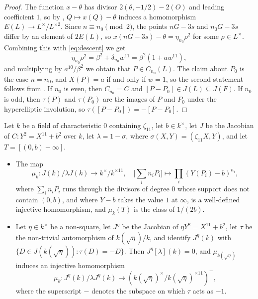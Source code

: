 \documentclass[11pt,reqno]{amsart}
\theoremstyle{definition}
\numberwithin{equation}{section}
\begin{document}
\begin{proof}
The function $x-\theta$ has divisor $2(\theta,-1/2)-2(O)$ and leading coefficient $1$, so by , $Q\mapsto x(Q)-\theta$ induces a homomorphism $E(L)\rightarrow L^\times/L^{\times 2}$. Since $n\equiv n_0\pmod 2$, the points $nG-3s$ and $n_0G-3s$ differ by an element of $2E(L)$, so $x(nG-3s)-\theta=\eta_{n_0}\rho^2$ for some $\rho\in L^\times$. Combining this with \eqref{eq:descent} we get
$$\eta_{n_0}\rho^2=\beta^2+\delta_{n_0}w^{11}=\beta^2(1+aw^{11}),$$
and multiplying by $a^{10}/\beta^2$ we obtain that $P\in C_{n_0}(L)$. The claim about $P_0$ is the case $n=n_0$, and $X(P)=a$ if and only if $w=1$, so the second statement follows from . If $n_0$ is even, then $C_{n_0}=C$ and $[P-P_0]\in J(L)\subseteq J(F)$. If $n_0$ is odd, then $\tau(P)$ and $\tau(P_0)$ are the images of $P$ and $P_0$ under the hyperelliptic involution, so $\tau([P-P_0])=-[P-P_0]$.
\end{proof}

\begin{lemma}\label{lem:kummer}
Let $k$ be a field of characteristic $0$ containing $\zeta_{11}$, let $b\in k^\times$, let $J$ be the Jacobian of $C\colon Y^2=X^{11}+b^2$ over $k$, let $\lambda=1-\sigma$, where $\sigma(X,Y)=(\zeta_{11}X,Y)$, and let $T=[(0,b)-\infty]$.
\begin{itemize}
\item[a)] The map
$$\mu_k\colon J(k)/\lambda J(k)\rightarrow k^\times/k^{\times 11},\quad \Big[\sum_i n_iP_i\Big]\mapsto \prod_i (Y(P_i)-b)^{n_i},$$
where $\sum_i n_iP_i$ runs through the divisors of degree $0$ whose support does not contain $(0,b)$, and where $Y-b$ takes the value $1$ at $\infty$, is a well-defined injective homomorphism, and $\mu_k(T)$ is the class of $1/(2b)$.
\item[b)] Let $\eta\in k^\times$ be a non-square, let $J^\eta$ be the Jacobian of $\eta Y^2=X^{11}+b^2$, let $\tau$ be the non-trivial automorphism of $k(\sqrt\eta)/k$, and identify $J^\eta(k)$ with $\{D\in J(k(\sqrt\eta)):\tau(D)=-D\}$. Then $J^\eta[\lambda](k)=0$, and $\mu_{k(\sqrt\eta)}$ induces an injective homomorphism
$$\mu_k\colon J^\eta(k)/\lambda J^\eta(k)\rightarrow \left(k(\sqrt\eta)^\times/k(\sqrt\eta)^{\times 11}\right)^-,$$
where the superscript $-$ denotes the subspace on which $\tau$ acts as $-1$.
\end{itemize}
\end{lemma}
\end{document}
